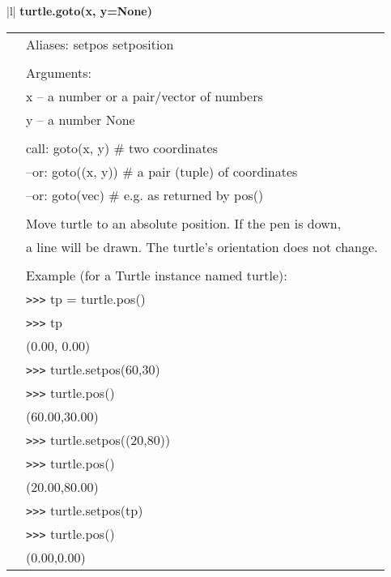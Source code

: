 \begin{center}
{\begin{tabular}{|l|}
{\bf    turtle.goto(x, y=None)} \\
   \begin{tabular}{p{0.25in}p{4in}}
&        Aliases: setpos  setposition \\
&  \\
&        Arguments: \\
&        x -- a number      or     a pair/vector of numbers \\
&        y -- a number             None \\
&  \\
&        call: goto(x, y)         \# two coordinates \\
&        --or: goto((x, y))       \# a pair (tuple) of coordinates \\
&        --or: goto(vec)          \# e.g. as returned by pos() \\
&  \\
&        Move turtle to an absolute position. If the pen is down, \\
&        a line will be drawn. The turtle's orientation does not change. \\
&  \\
&        Example (for a Turtle instance named turtle): \\
&        \verb+>+\verb+>+\verb+>+ tp = turtle.pos() \\
&        \verb+>+\verb+>+\verb+>+ tp \\
&        (0.00, 0.00) \\
&        \verb+>+\verb+>+\verb+>+ turtle.setpos(60,30) \\
&        \verb+>+\verb+>+\verb+>+ turtle.pos() \\
&        (60.00,30.00) \\
&        \verb+>+\verb+>+\verb+>+ turtle.setpos((20,80)) \\
&        \verb+>+\verb+>+\verb+>+ turtle.pos() \\
&        (20.00,80.00) \\
&        \verb+>+\verb+>+\verb+>+ turtle.setpos(tp) \\
&        \verb+>+\verb+>+\verb+>+ turtle.pos() \\
&        (0.00,0.00) \\
\end{tabular} \\ \hline

\end{tabular}}
\end{center}
